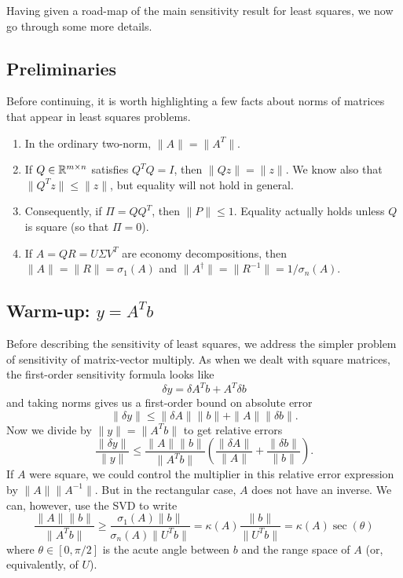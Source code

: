 \documentclass[12pt, leqno]{article} %
\begin{document}
Having given a road-map of the main sensitivity result for least
squares, we now go through some more details.


\subsection{Preliminaries}

Before continuing, it is worth highlighting a few facts about
norms of matrices that appear in least squares problems.
\begin{enumerate}
  \item In the ordinary two-norm, $\|A\| = \|A^T\|$.
  \item If $Q \in \mathbb{R}^{m \times n}$ satisfies $Q^T Q = I$,
  then $\|Qz\| = \|z\|$.  We know also that $\|Q^T z\| \leq \|z\|$,
  but equality will not hold in general.
  \item Consequently, if $\Pi = QQ^T$, then $\|P\| \leq 1$.  Equality
  actually holds unless $Q$ is square (so that $\Pi = 0$).
  \item If $A = QR = U \Sigma V^T$ are economy decompositions,
  then $\|A\| = \|R\| = \sigma_1(A)$ and
  $\|A^\dagger\| = \|R^{-1}\| = 1/\sigma_n(A)$.
\end{enumerate}

\subsection{Warm-up: $y = A^T b$}

Before describing the sensitivity of least squares, we address
the simpler problem of sensitivity of matrix-vector multiply.
As when we dealt with square matrices, the first-order
sensitivity formula looks like
\[
  \delta y = \delta A^T b + A^T \delta b
\]
and taking norms gives us a first-order bound on absolute error
\[
  \|\delta y\| \leq \|\delta A\| \|b\| + \|A\| \|\delta b\|.
\]
Now we divide by $\|y\| = \|A^T b\|$ to get relative errors
\[
  \frac{\|\delta y\|}{\|y\|} \leq
    \frac{\|A\| \|b\|}{\|A^T b\|} \left(
    \frac{\|\delta A\|}{\|A\|} +
    \frac{\|\delta b\|}{\|b\|} \right).
\]
If $A$ were square, we could control the multiplier in this relative
error expression by $\|A\| \|A^{-1}\|$.  But in the rectangular case,
$A$ does not have an inverse.  We can, however, use the SVD to write
\[
  \frac{\|A\| \|b\|}{\|A^T b\|} \geq
  \frac{\sigma_1(A) \|b\|}{\sigma_n(A) \|U^T b\|} =
  \kappa(A) \frac{\|b\|}{\|U^T b\|} = \kappa(A) \sec(\theta)
\]
where $\theta \in [0, \pi/2]$ is the acute angle between $b$ and the
range space of $A$ (or, equivalently, of $U$).
\end{document}

